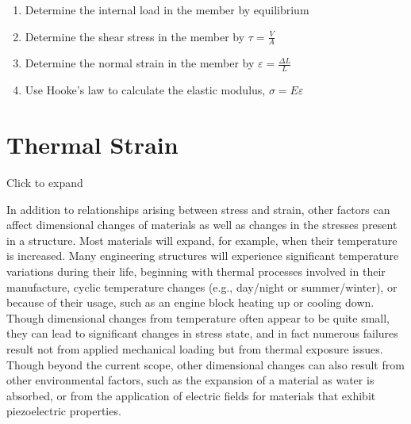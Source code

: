 \documentclass[
  letterpaper,
  DIV=11,
  numbers=noendperiod]{scrreprt}
\providecommand{\tightlist}{%
  \setlength{\itemsep}{0pt}\setlength{\parskip}{0pt}}\usepackage{longtable,booktabs,array}
\begin{document}
\begin{tcolorbox}[enhanced jigsaw, breakable, opacityback=0, toptitle=1mm, left=2mm, colback=white, opacitybacktitle=0.6, colframe=quarto-callout-warning-color-frame, titlerule=0mm, arc=.35mm, leftrule=.75mm, bottomtitle=1mm, colbacktitle=quarto-callout-warning-color!10!white, rightrule=.15mm, title={Step-by-step:}, bottomrule=.15mm, toprule=.15mm, coltitle=black]

\begin{enumerate}
\def\labelenumi{\arabic{enumi}.}
\tightlist
\item
  Determine the internal load in the member by equilibrium
\item
  Determine the shear stress in the member by \(\tau=\frac{V}{A}\)
\item
  Determine the normal strain in the member by
  \(\varepsilon=\frac{\Delta L}{L}\)
\item
  Use Hooke's law to calculate the elastic modulus,
  \(\sigma=E \varepsilon\)
\end{enumerate}

\end{tcolorbox}

\section{Thermal Strain}\label{sec-4.6}

Click to expand

In addition to relationships arising between stress and strain, other
factors can affect dimensional changes of materials as well as changes
in the stresses present in a structure. Most materials will expand, for
example, when their temperature is increased. Many engineering
structures will experience significant temperature variations during
their life, beginning with thermal processes involved in their
manufacture, cyclic temperature changes (e.g., day/night or
summer/winter), or because of their usage, such as an engine block
heating up or cooling down. Though dimensional changes from temperature
often appear to be quite small, they can lead to significant changes in
stress state, and in fact numerous failures result not from applied
mechanical loading but from thermal exposure issues. Though beyond the
current scope, other dimensional changes can also result from other
environmental factors, such as the expansion of a material as water is
absorbed, or from the application of electric fields for materials that
exhibit piezoelectric properties.
\end{document}
